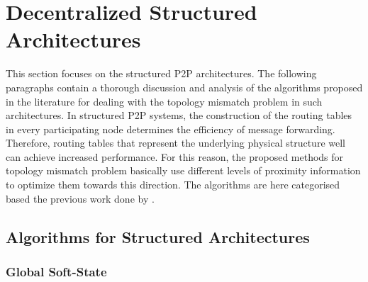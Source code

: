 \section{Decentralized Structured Architectures}
\label{section:structured}

This section focuses on the structured P2P architectures. The following
paragraphs contain a thorough discussion and analysis of the algorithms proposed
in the literature for dealing with the topology mismatch problem in such
architectures. In structured P2P systems, the construction of the routing tables
in every participating node determines the efficiency of message forwarding.
Therefore, routing tables that represent the underlying physical structure well
can achieve increased performance. For this reason, the proposed methods for
topology mismatch problem basically use different levels of proximity
information to optimize them towards this direction. The algorithms are here
categorised based the previous work done by \cite{CDHR2002,CDCR2002,RSS2002}.

\subsection{Algorithms for Structured Architectures}


\subsubsection{Global Soft-State}


